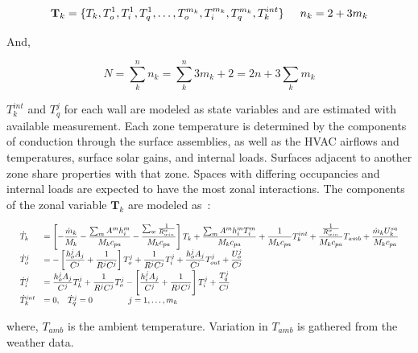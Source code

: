 \begin{equation}
\textbf{T}_k = \lbrace T_k, T_o^1, T_i^1, T_q^1, \ldots, T_o^{m_k}, T_i^{m_k}, T_q^{m_k}, T_k^{int}  \rbrace \hspace{5mm} n_k = 2 + 3m_k 
\end{equation}

\noindent And,

\begin{equation}
N = \sum_k^n n_k = \sum_k^n 3m_k + 2 = 2n + 3 \sum_k m_k
\end{equation}


\noindent $T_k^{int}$ and  $T_q^j$ for each wall are modeled as state variables and are estimated with available measurement. Each zone temperature is determined by the components of conduction through the surface assemblies, as well as the HVAC airflows and temperatures, surface solar gains, and internal loads. Surfaces adjacent to another zone share properties with that zone. Spaces with differing occupancies and internal loads are expected to have the most zonal interactions. The components of the zonal variable $\textbf{T}_k$ are modeled as~\citep{o2010model}:

\begin{equation}
\label{zone_equation}
\resizebox{\textwidth}{!}{$ 
\begin{array}{ll}
\dot{T}_k &= \displaystyle \left[ -\frac{\dot{m}_k}{M_k} - \frac{\sum_m A^m h_i^m}{M_k c_{pa}} -  \frac{ \sum_w \frac{1}{R_{win}^w}}{M_k c_{pa}} \right] T_k + \frac{\sum_m A^m h_i^m T_i^m}{M_k c_{pa}} + \frac{1}{M_k c_{pa}} T^{int}_k + \frac{\frac{1}{R_{win}^w}}{M_k  c_{pa}}  T_{amb} +\frac{\dot{m}_k U_k^{sa}}{M_k  c_{pa}}  \\
\dot{T}^j_o &= - \displaystyle \left[ \frac{h_o^j A_j}{C^j} + \frac{1}{R^j C^j} \right] T_o^j + \frac{1}{R^j C^j} T_i^j + \frac{h_o^j A_j}{C^j} T^j_{out} + \frac{U^j_o}{C^j}  \\
\dot{T}^j_i &= \displaystyle \frac{h_o^j A_j}{C^j} T^j_{k} + \frac{1}{R^j C^j} T_o^j  - \displaystyle \left[ \frac{h_i^j A_j}{C^j} + \frac{1}{R^j C^j} \right] T_i^j  + \frac{T^j_q}{C^j} \\
\dot{T}_k^{int} &= 0, \hspace{3mm}  \dot{T}^j_q = 0 \hspace{15mm} j = 1,\ldots,m_k
\end{array}
$}
\end{equation}

\noindent where, $T_{amb}$ is the ambient temperature. Variation in $T_{amb}$ is gathered from the weather data.


